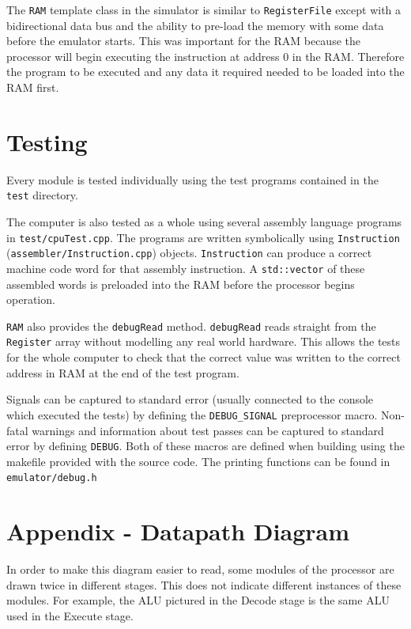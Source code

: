 \documentclass[11pt,a4paper]{IEEEtran}
\begin{document}
				The \texttt{RAM} template class in the simulator is similar to \texttt{RegisterFile} except with a bidirectional data bus and the ability to pre-load the memory with some data before the emulator starts. This was important for the RAM because the processor will begin executing the instruction at address 0 in the RAM. Therefore the program to be executed and any data it required needed to be loaded into the RAM first. 
	
	\section{Testing}
	Every module is tested individually using the test programs contained in the \texttt{test} directory. 
	
	The computer is also tested as a whole using several assembly language programs in \texttt{test/cpuTest.cpp}. The programs are written symbolically using \texttt{Instruction } (\texttt{assembler/Instruction.cpp}) objects. \texttt{Instruction} can produce a correct machine code word for that assembly instruction. A \texttt{std::vector} of these assembled words is preloaded into the RAM before the processor begins operation.
	
	\texttt{RAM} also provides the \texttt{debugRead} method. \texttt{debugRead} reads straight from the \texttt{Register} array without modelling any real world hardware. This allows the tests for the whole computer to check that the correct value was written to the correct address in RAM at the end of the test program. 
	
	Signals can be captured to standard error (usually connected to the console which executed the tests) by defining the \texttt{DEBUG\_SIGNAL} preprocessor macro. Non-fatal warnings and information about test passes can be captured to standard error by defining \texttt{DEBUG}. Both of these macros are defined when building using the makefile provided with the source code. The printing functions can be found in \texttt{emulator/debug.h}

	\printbibliography	
	
	\section{Appendix - Datapath Diagram}
	\label{Sec::Datapath}
	In order to make this diagram easier to read, some modules of the processor are drawn twice in different stages. This does not indicate different instances of these modules. For example, the ALU pictured in the Decode stage is the same ALU used in the Execute stage.
\end{document}
